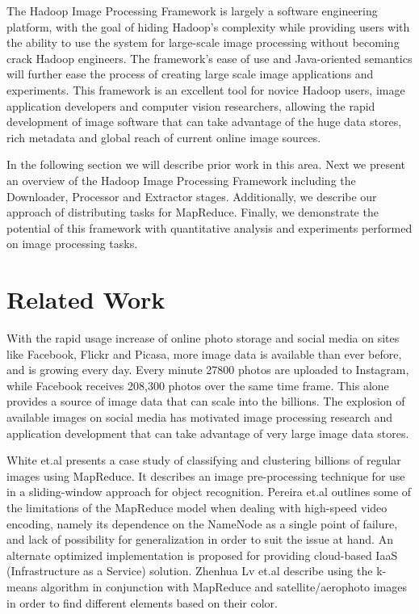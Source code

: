 \documentclass[conference]{IEEEtran}
\begin{document}
The Hadoop Image Processing Framework is largely a software
engineering platform, with the goal of hiding Hadoop's complexity
while providing users with the ability to use the system for
large-scale image processing without becoming crack Hadoop engineers.
The framework's ease of use and Java-oriented semantics will further
ease the process of creating large scale image applications and
experiments. This framework is an excellent tool for novice Hadoop
users, image application developers and computer vision researchers,
allowing the rapid development of image software that can take
advantage of the huge data stores, rich metadata and global reach of
current online image sources.
	
In the following section we will describe prior work in this
area. Next we present an overview of the Hadoop Image Processing
Framework including the Downloader, Processor and Extractor
stages. Additionally, we describe our approach of distributing tasks
for MapReduce. Finally, we demonstrate the potential of this framework
with quantitative analysis and experiments performed on image
processing tasks.
	
\section{Related Work}
With the rapid usage increase of online photo storage and social media
on sites like Facebook, Flickr and Picasa, more image data is
available than ever before, and is growing every day.  Every minute
27800 photos are uploaded to Instagram, \cite{Horaczek2013}while Facebook receives
208,300 photos over the same time frame. This alone
provides a source of image data that can scale into the billions.  The
explosion of available images on social media has motivated image
processing research and application development that can take
advantage of very large image data stores.

White et.al \cite{White2010} presents a case study of classifying and clustering billions of regular images using MapReduce. It describes an image pre-processing technique for use in a sliding-window approach for object recognition. Pereira et.al \cite{Pereira2010} outlines some of the limitations of the MapReduce model when dealing with high-speed video encoding, namely its dependence on the NameNode as a single point of failure, and lack of possibility for generalization in order to suit the issue at hand. An alternate optimized implementation is proposed for providing cloud-based IaaS (Infrastructure as a Service) solution.  Zhenhua Lv et.al \cite{Lv2010} describe using the k-means algorithm in conjunction with MapReduce and satellite/aerophoto images in order to find different elements based on their color.
\end{document}
